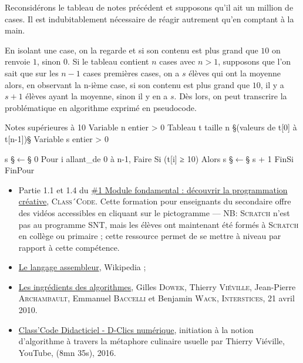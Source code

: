 Reconsidérons le tableau de notes précédent et supposons qu'il ait un million de cases. Il est indubitablement nécessaire de réagir autrement qu'en comptant à la main. 

En isolant une case, on la regarde et si son contenu est plus grand que $10$ on renvoie $1$, sinon $0$. Si le tableau contient $n$ cases avec $n > 1$, supposons que l'on sait que sur les $n-1$ cases premières cases, on a $s$ élèves qui ont la moyenne alors, en observant la n-ième case, si son contenu est plus grand que $10$, il y a $s+1$ élèves ayant la moyenne, sinon il y en a $s$. Dès lors, on peut transcrire la problématique en algorithme exprimé en pseudocode.

\begin{algorithm}{Notes supérieures à 10}
Variable n entier > 0
Tableau  t taille n §(valeurs de t[0] à t[n-1])§
Variable s entier > 0

s §$\leftarrow$§ 0
Pour i allant_de 0 à n-1, Faire
  Si (t[i] ≥ 10)
    Alors s §$\leftarrow$§ s + 1
  FinSi
FinPour
\end{algorithm}

\begin{gofurther}
\begin{itemize}\jazzitem
	\item Partie 1.1 et 1.4 du \href{https://pixees.fr/classcode/formations/module1/\#partie1}{\#1 Module fondamental : découvrir la programmation créative}, \textsc{Class´Code}. Cette formation pour enseignants du secondaire offre des vidéos accessibles en cliquant sur le pictogramme  --- NB: \textsc{Scratch} n'est pas au programme SNT, mais les élèves ont maintenant été formés à \textsc{Scratch} en collège ou primaire ; cette ressource permet de se mettre à niveau par rapport à cette compétence.
\end{itemize}

\begin{itemize}\jazzitem
\item \href{https://fr.wikipedia.org/wiki/Assembleur}{Le langage assembleur}, Wikipedia ;
\item \href{https://interstices.info/les-ingredients-des-algorithmes/}{Les ingrédients des algorithmes}, Gilles \textsc{Dowek}, Thierry \textsc{Viéville}, Jean-Pierre \textsc{Archambault}, Emmanuel \textsc{Baccelli} et Benjamin \textsc{Wack}, \textsc{Interstices}, 21 avril 2010.
\end{itemize}

\begin{itemize}\jazzitem
\item \href{https://www.youtube.com/watch?v=AWsNFN0GCuQ}{Class'Code Didacticiel - D-Clics numérique}, initiation à la notion d'algorithme à travers la métaphore culinaire usuelle par Thierry Viéville, YouTube, (8mn 35s), 2016.
\end{itemize}
\end{gofurther}

